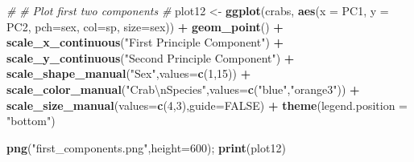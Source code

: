 \documentclass[11pt,]{article}
\newenvironment{Shaded}{\begin{snugshade}}{\end{snugshade}}
\newcommand{\CharTok}[1]{\textcolor[rgb]{0.31,0.60,0.02}{#1}}
\newcommand{\CommentTok}[1]{\textcolor[rgb]{0.56,0.35,0.01}{\textit{#1}}}
\newcommand{\DataTypeTok}[1]{\textcolor[rgb]{0.13,0.29,0.53}{#1}}
\newcommand{\DecValTok}[1]{\textcolor[rgb]{0.00,0.00,0.81}{#1}}
\newcommand{\KeywordTok}[1]{\textcolor[rgb]{0.13,0.29,0.53}{\textbf{#1}}}
\newcommand{\NormalTok}[1]{#1}
\newcommand{\OperatorTok}[1]{\textcolor[rgb]{0.81,0.36,0.00}{\textbf{#1}}}
\newcommand{\OtherTok}[1]{\textcolor[rgb]{0.56,0.35,0.01}{#1}}
\newcommand{\StringTok}[1]{\textcolor[rgb]{0.31,0.60,0.02}{#1}}
\begin{document}
\begin{Shaded}
\begin{Highlighting}[]
\CommentTok{#}
\CommentTok{# Plot first two components}
\CommentTok{#}
\NormalTok{plot12 <-}\StringTok{ }\KeywordTok{ggplot}\NormalTok{(crabs, }\KeywordTok{aes}\NormalTok{(}\DataTypeTok{x =}\NormalTok{ PC1, }\DataTypeTok{y =}\NormalTok{ PC2, }\DataTypeTok{pch=}\NormalTok{sex, }\DataTypeTok{col=}\NormalTok{sp, }\DataTypeTok{size=}\NormalTok{sex)) }\OperatorTok{+}
\StringTok{        }\KeywordTok{geom_point}\NormalTok{()                                                    }\OperatorTok{+}
\StringTok{        }\KeywordTok{scale_x_continuous}\NormalTok{(}\StringTok{"First Principle Component"}\NormalTok{)                 }\OperatorTok{+}
\StringTok{        }\KeywordTok{scale_y_continuous}\NormalTok{(}\StringTok{"Second Principle Component"}\NormalTok{)                }\OperatorTok{+}
\StringTok{        }\KeywordTok{scale_shape_manual}\NormalTok{(}\StringTok{"Sex"}\NormalTok{,}\DataTypeTok{values=}\KeywordTok{c}\NormalTok{(}\DecValTok{1}\NormalTok{,}\DecValTok{15}\NormalTok{))                        }\OperatorTok{+}
\StringTok{        }\KeywordTok{scale_color_manual}\NormalTok{(}\StringTok{"Crab}\CharTok{\textbackslash{}n}\StringTok{Species"}\NormalTok{,}\DataTypeTok{values=}\KeywordTok{c}\NormalTok{(}\StringTok{"blue"}\NormalTok{,}\StringTok{"orange3"}\NormalTok{))  }\OperatorTok{+}
\StringTok{        }\KeywordTok{scale_size_manual}\NormalTok{(}\DataTypeTok{values=}\KeywordTok{c}\NormalTok{(}\DecValTok{4}\NormalTok{,}\DecValTok{3}\NormalTok{),}\DataTypeTok{guide=}\OtherTok{FALSE}\NormalTok{)                    }\OperatorTok{+}
\StringTok{        }\KeywordTok{theme}\NormalTok{(}\DataTypeTok{legend.position =} \StringTok{"bottom"}\NormalTok{)}

\KeywordTok{png}\NormalTok{(}\StringTok{"first_components.png"}\NormalTok{,}\DataTypeTok{height=}\DecValTok{600}\NormalTok{); }\KeywordTok{print}\NormalTok{(plot12)}


\end{Highlighting}
\end{Shaded}
\end{document}
